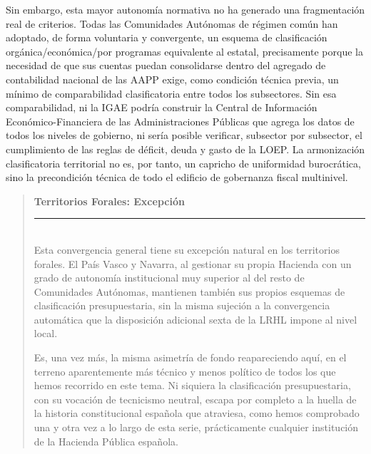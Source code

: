 \documentclass[10pt,a4paper]{article}
\newenvironment{specialblock}[1]{%
      \begin{quote} %
      \small %
      \noindent\textbf{#1}\\[-0.3em] %
      \rule{\linewidth}{0.4pt}\\[0.6em]}{
      \end{quote}}
\begin{document}
Sin embargo, esta mayor autonomía normativa no ha generado una fragmentación real de criterios. Todas las Comunidades Autónomas de régimen común han adoptado, de forma voluntaria y convergente, un esquema de clasificación orgánica/económica/por programas equivalente al estatal, precisamente porque la necesidad de que sus cuentas puedan consolidarse dentro del agregado de contabilidad nacional de las AAPP exige, como condición técnica previa, un mínimo de comparabilidad clasificatoria entre todos los subsectores. Sin esa comparabilidad, ni la IGAE podría construir la Central de Información Económico-Financiera de las Administraciones Públicas que agrega los datos de todos los niveles de gobierno, ni sería posible verificar, subsector por subsector, el cumplimiento de las reglas de déficit, deuda y gasto de la LOEP. La armonización clasificatoria territorial no es, por tanto, un capricho de uniformidad burocrática, sino la precondición técnica de todo el edificio de gobernanza fiscal multinivel.

\begin{specialblock}{\textbf{Territorios Forales:} Excepción}
    Esta convergencia general tiene su excepción natural en los territorios forales. El País Vasco y Navarra, al gestionar su propia Hacienda con un grado de autonomía institucional muy superior al del resto de Comunidades Autónomas, mantienen también sus propios esquemas de clasificación presupuestaria, sin la misma sujeción a la convergencia automática que la disposición adicional sexta de la LRHL impone al nivel local. 
    
    Es, una vez más, la misma asimetría de fondo reapareciendo aquí, en el terreno aparentemente más técnico y menos político de todos los que hemos recorrido en este tema. Ni siquiera la clasificación presupuestaria, con su vocación de tecnicismo neutral, escapa por completo a la huella de la historia constitucional española que atraviesa, como hemos comprobado una y otra vez a lo largo de esta serie, prácticamente cualquier institución de la Hacienda Pública española.
\end{specialblock}



\clearpage
\end{document}
